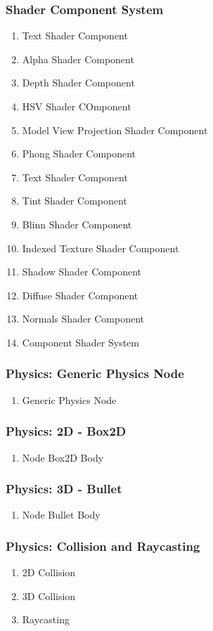 \subsubsection{Shader Component System}
\begin{enumerate}
\item Text Shader Component
\item Alpha Shader Component
\item Depth Shader Component
\item HSV Shader COmponent
\item Model View Projection Shader Component
\item Phong Shader Component
\item Text Shader Component
\item Tint Shader Component
\item Blinn Shader Component
\item Indexed Texture Shader Component
\item Shadow Shader Component
\item Diffuse Shader Component
\item Normals Shader Component
\item Component Shader System
\end{enumerate}
\subsubsection{Physics: Generic Physics Node}
\begin{enumerate}
\item Generic Physics Node
\end{enumerate}
\subsubsection{Physics: 2D - Box2D}
\begin{enumerate}
\item Node Box2D Body
\end{enumerate}
\subsubsection{Physics: 3D - Bullet}
\begin{enumerate}
\item Node Bullet Body
\end{enumerate}
\subsubsection{Physics: Collision and Raycasting}
\begin{enumerate}
\item 2D Collision
\item 3D Collision
\item Raycasting
\end{enumerate}
